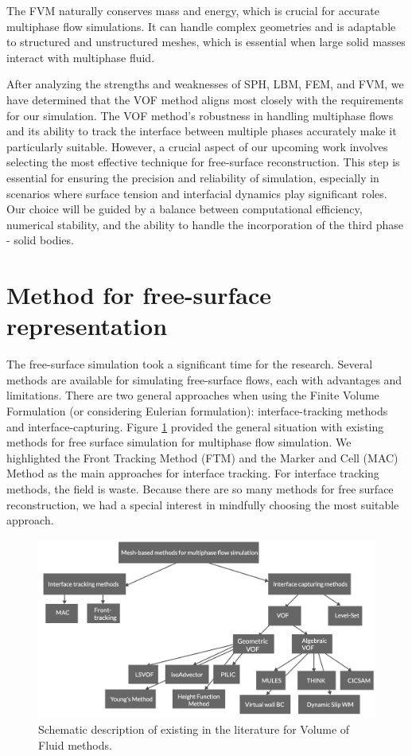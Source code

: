 The FVM naturally conserves mass and energy, which is crucial for accurate multiphase flow simulations. It can handle complex geometries and is adaptable to structured and unstructured meshes, which is essential when large solid masses interact with multiphase fluid.

After analyzing the strengths and weaknesses of SPH, LBM, FEM, and FVM, we have determined that the VOF method aligns most closely with the requirements for our simulation. The VOF method's robustness in handling multiphase flows and its ability to track the interface between multiple phases accurately make it particularly suitable. However, a crucial aspect of our upcoming work involves selecting the most effective technique for free-surface reconstruction. This step is essential for ensuring the precision and reliability of simulation, especially in scenarios where surface tension and interfacial dynamics play significant roles. Our choice will be guided by a balance between computational efficiency, numerical stability, and the ability to handle the incorporation of the third phase - solid bodies.

\section{Method for free-surface representation} %

The free-surface simulation took a significant time for the research. Several methods are available for simulating free-surface flows, each with advantages and limitations. There are two general approaches when using the Finite Volume Formulation (or considering Eulerian formulation): interface-tracking methods and interface-capturing. Figure \ref{fig:vof_methods} provided the general situation with existing methods for free surface simulation for multiphase flow simulation. We highlighted the Front Tracking Method (FTM)\cite{front-tracking} and the Marker and Cell (MAC) Method \cite{mac} as the main approaches for interface tracking. For interface tracking methods, the field is waste. Because there are so many methods for free surface reconstruction, we had a special interest in mindfully choosing the most suitable approach.

\begin{figure}[!ht]
    \centering
    \includegraphics[width=14.5cm]{Images/chap1/VOF_methods.png}
    \caption{Schematic description of existing in the literature for Volume of Fluid methods.}
    \label{fig:vof_methods}
\end{figure}


